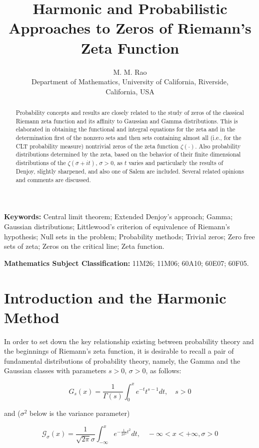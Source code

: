 \documentclass[11pt]{article}
\title{Harmonic and Probabilistic Approaches to Zeros of Riemann's Zeta Function}
\author{M. M. Rao\\
Department of Mathematics, University of California, Riverside,\\
California, USA}
\date{}
\begin{document}
\maketitle

\begin{abstract}
Probability concepts and results are closely related to the study of zeros of the classical Riemann zeta function and its affinity to Gaussian and Gamma distributions. This is elaborated in obtaining the functional and integral equations for the zeta and in the determination first of the nonzero sets and then sets containing almost all (i.e., for the CLT probability measure) nontrivial zeros of the zeta function $\zeta(\cdot)$. Also probability distributions determined by the zeta, based on the behavior of their finite dimensional distributions of the $\zeta(\sigma + it)$, $\sigma > 0$, as $t$ varies and particularly the results of Denjoy, slightly sharpened, and also one of Salem are included. Several related opinions and comments are discussed.
\end{abstract}

\textbf{Keywords:} Central limit theorem; Extended Denjoy's approach; Gamma; Gaussian distributions; Littlewood's criterion of equivalence of Riemann's hypothesis; Null sets in the problem; Probability methods; Trivial zeros; Zero free sets of zeta; Zeros on the critical line; Zeta function.

\textbf{Mathematics Subject Classification:} 11M26; 11M06; 60A10; 60E07; 60F05.

\section{Introduction and the Harmonic Method}
\label{sec:intro}

In order to set down the key relationship existing between probability theory and the beginnings of Riemann's zeta function, it is desirable to recall a pair of fundamental distributions of probability theory, namely, the Gamma and the Gaussian classes with parameters $s > 0$, $\sigma > 0$, as follows:

\begin{equation}
\label{eq:gamma}
G_s(x) = \frac{1}{\Gamma(s)} \int_0^x e^{-t} t^{s-1} dt, \quad s > 0
\end{equation}

and ($\sigma^2$ below is the variance parameter)

\begin{equation}
\label{eq:gaussian}
\mathcal{G}_\sigma(x) = \frac{1}{\sqrt{2\pi}\sigma} \int_{-\infty}^x e^{-\frac{1}{2\sigma^2} t^2} dt, \quad -\infty < x < +\infty, \sigma > 0
\end{equation}
\end{document}
